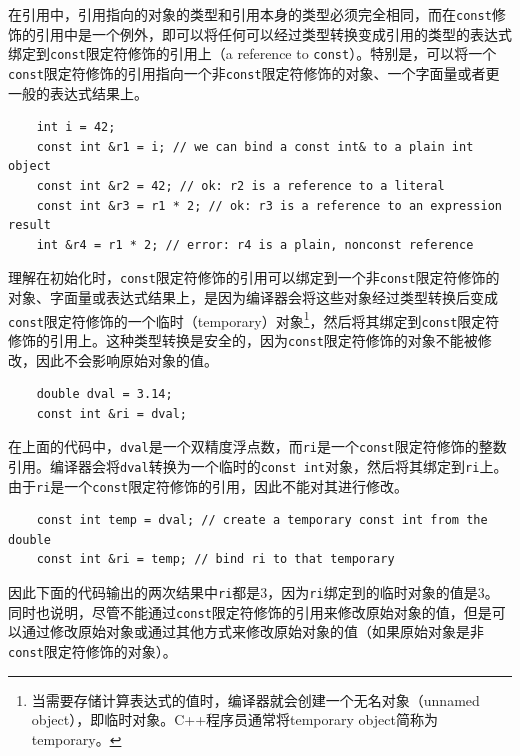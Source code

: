 在引用中，引用指向的对象的类型和引用本身的类型必须完全相同，而在\texttt{const}修饰的引用中是一个例外，即可以将任何可以经过类型转换变成引用的类型的表达式绑定到\texttt{const}限定符修饰的引用上（a reference to \texttt{const}）。特别是，可以将一个\texttt{const}限定符修饰的引用指向一个非\texttt{const}限定符修饰的对象、一个字面量或者更一般的表达式结果上。

\begin{verbatim}
    int i = 42;
    const int &r1 = i; // we can bind a const int& to a plain int object
    const int &r2 = 42; // ok: r2 is a reference to a literal
    const int &r3 = r1 * 2; // ok: r3 is a reference to an expression result
    int &r4 = r1 * 2; // error: r4 is a plain, nonconst reference
\end{verbatim}

理解在初始化时，\texttt{const}限定符修饰的引用可以绑定到一个非\texttt{const}限定符修饰的对象、字面量或表达式结果上，是因为编译器会将这些对象经过类型转换后变成\texttt{const}限定符修饰的一个临时（temporary）对象\footnote{当需要存储计算表达式的值时，编译器就会创建一个无名对象（unnamed object），即临时对象。C++程序员通常将temporary object简称为temporary。}，然后将其绑定到\texttt{const}限定符修饰的引用上。这种类型转换是安全的，因为\texttt{const}限定符修饰的对象不能被修改，因此不会影响原始对象的值。

\begin{verbatim}
    double dval = 3.14;
    const int &ri = dval;
\end{verbatim}

在上面的代码中，\texttt{dval}是一个双精度浮点数，而\texttt{ri}是一个\texttt{const}限定符修饰的整数引用。编译器会将\texttt{dval}转换为一个临时的\texttt{const int}对象，然后将其绑定到\texttt{ri}上。由于\texttt{ri}是一个\texttt{const}限定符修饰的引用，因此不能对其进行修改。

\begin{verbatim}
    const int temp = dval; // create a temporary const int from the double
    const int &ri = temp; // bind ri to that temporary
\end{verbatim}

因此下面的代码输出的两次结果中\texttt{ri}都是3，因为\texttt{ri}绑定到的临时对象的值是3。同时也说明，尽管不能通过\texttt{const}限定符修饰的引用来修改原始对象的值，但是可以通过修改原始对象或通过其他方式来修改原始对象的值（如果原始对象是非\texttt{const}限定符修饰的对象）。

